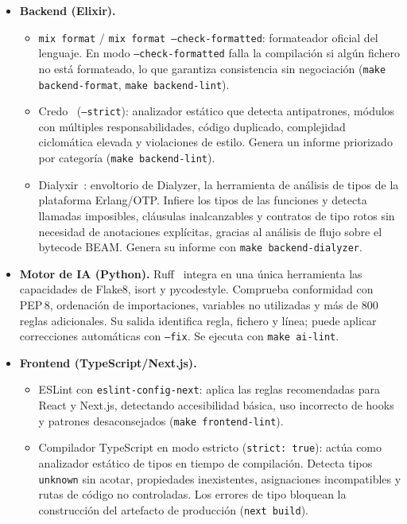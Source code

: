 \begin{itemize}
 \item \textbf{Backend (Elixir).}
 \begin{itemize}
 \item \texttt{mix format} / \texttt{mix format --check-formatted}: formateador oficial del lenguaje. En modo \texttt{--check-formatted} falla la compilación si algún fichero no está formateado, lo que garantiza consistencia sin negociación (\texttt{make backend-format}, \texttt{make backend-lint}).
 \item Credo~\cite{Credo} (\texttt{--strict}): analizador estático que detecta antipatrones, módulos con múltiples responsabilidades, código duplicado, complejidad ciclomática elevada y violaciones de estilo. Genera un informe priorizado por categoría (\texttt{make backend-lint}).
 \item Dialyxir~\cite{Dialyxir}: envoltorio de Dialyzer, la herramienta de análisis de tipos de la plataforma Erlang/OTP. Infiere los tipos de las funciones y detecta llamadas imposibles, cláusulas inalcanzables y contratos de tipo rotos sin necesidad de anotaciones explícitas, gracias al análisis de flujo sobre el bytecode BEAM. Genera su informe con \texttt{make backend-dialyzer}.
 \end{itemize}
 \item \textbf{Motor de IA (Python).} Ruff~\cite{Ruff} integra en una única herramienta las capacidades de Flake8, isort y pycodestyle. Comprueba conformidad con PEP\,8, ordenación de importaciones, variables no utilizadas y más de 800 reglas adicionales. Su salida identifica regla, fichero y línea; puede aplicar correcciones automáticas con \texttt{--fix}. Se ejecuta con \texttt{make ai-lint}.
 \item \textbf{Frontend (TypeScript/Next.js).}
 \begin{itemize}
 \item ESLint con \texttt{eslint-config-next}: aplica las reglas recomendadas para React y Next.js, detectando accesibilidad básica, uso incorrecto de hooks y patrones desaconsejados (\texttt{make frontend-lint}).
 \item Compilador TypeScript en modo estricto (\texttt{strict: true}): actúa como analizador estático de tipos en tiempo de compilación. Detecta tipos \texttt{unknown} sin acotar, propiedades inexistentes, asignaciones incompatibles y rutas de código no controladas. Los errores de tipo bloquean la construcción del artefacto de producción (\texttt{next build}).
 \end{itemize}
\end{itemize}

